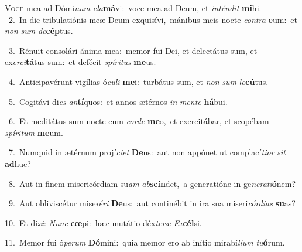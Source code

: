 \lettrine{\initial\textcolor{\initialcolor}{V}}{oce} mea ad Dómi\textit{num} \textit{cla}\-\textbf{má}vi:~\star voce mea ad Deum, et \textit{in}\-\textit{tén}\textit{dit} \textbf{mi}\-hi.\\
{\numbfont\textcolor{\numbcolor}{~2.}}~In die tribulatiónis meæ Deum exquisívi,~\dagger mánibus meis nocte \textit{con}\-\textit{tra} \textbf{e}\-um:~\star et \textit{non} \textit{sum} \textit{de}\-\textbf{cép}tus.\par
{\numbfont\textcolor{\numbcolor}{~3.}}~Rénuit consolári ánima mea:~\dagger memor fui Dei, et delectátus sum, et ex\-\textit{er}\-\textit{ci}\textbf{tá}tus sum:~\star et defécit \textit{spí}\-\textit{ri}\textit{tus} \textbf{me}\-us.\par
{\numbfont\textcolor{\numbcolor}{~4.}}~Anticipavérunt vigílias ó\-\textit{cu}\-\textit{li} \textbf{me}\-i:~\star turbátus sum, et \textit{non} \textit{sum} \textit{lo}\-\textbf{cú}tus.\par
{\numbfont\textcolor{\numbcolor}{~5.}}~Cogitávi di\textit{es} \textit{an}\-\textbf{tí}quos:~\star et annos ætérnos \textit{in} \textit{men}\-\textit{te} \textbf{há}\-bui.\par
{\numbfont\textcolor{\numbcolor}{~6.}}~Et meditátus sum nocte cum \textit{cor}\-\textit{de} \textbf{me}\-o,~\star et exercitábar, et scopébam \textit{spí}\-\textit{ri}\textit{tum} \textbf{me}\-um.\par
{\numbfont\textcolor{\numbcolor}{~7.}}~Numquid in ætérnum projí\-\textit{ci}\-\textit{et} \textbf{De}\-us:~\star aut non appónet ut complací\-\textit{ti}\-\textit{or} \textit{sit} \textbf{ad}\-huc?\par
{\numbfont\textcolor{\numbcolor}{~8.}}~Aut in finem misericórdiam su\textit{am} \textit{ab}\-\textbf{scín}det,~\star a generatióne in ge\-\textit{ne}\-\textit{ra}\textit{ti}\textbf{ó}nem?\par
{\numbfont\textcolor{\numbcolor}{~9.}}~Aut obliviscétur mise\-\textit{ré}\-\textit{ri} \textbf{De}\-us:~\star aut continébit in ira sua miseri\-\textit{cór}\-\textit{di}\textit{as} \textbf{su}\-as?\par
{\numbfont\textcolor{\numbcolor}{10.}}~Et di\-\textit{xi}\-: \textit{Nunc} \textbf{cœ}\-pi:~\star hæc mutátio déx\-\textit{te}\-\textit{ræ} \textit{Ex}\-\textbf{cél}si.\par
{\numbfont\textcolor{\numbcolor}{11.}}~Memor fui ó\-\textit{pe}\-\textit{rum} \textbf{Dó}\-mini:~\star quia memor ero ab inítio mirabí\-\textit{li}\-\textit{um} \textit{tu}\-\textbf{ó}rum.\par
